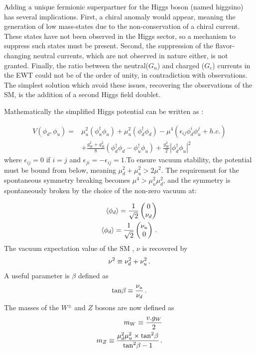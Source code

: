 Adding a unique fermionic superpartner for the Higgs boson (named higgsino) has several implications. First, a chiral anomaly would appear, meaning the generation of low mass-states due to the non-conservation of a chiral current. These states have not been observed in the Higgs sector, so a mechanism to suppress such states must be present. Second, the suppression of the flavor-changing neutral currents, which are not observed in nature either, is not granted. Finally, the ratio between the neutral($G_n$) and charged ($G_c$) currents in the EWT could not be of the order of unity, in contradiction with observations. The simplest solution which avoid these issues, recovering the observations of the SM, is the addition of a second Higgs field doublet.

Mathematically the simplified Higgs potential can be written as \cite{Nagashima:2014tva}:

\begin{align}
    V(\phi_d , \phi_u) = & \mu^{2}_u (\phi^{\dagger}_u \phi_u) + \mu^{2}_u (\phi^{\dagger}_d \phi_d) - \mu^{4}(\epsilon_{ij}\phi^{i}_d \phi^{j}_u + h.c.) \\ & + \frac{g^{2}_W + g^{2}_B}{8}(\phi^{\dagger}_d \phi_d - \phi^{\dagger}_u \phi_u) + \frac{g^{2}_W}{2} | \phi^{\dagger}_d \phi_u |^2
\end{align}
where $\epsilon_{ij} = 0$ if $i = j$ and $\epsilon_{ji} = -\epsilon_{ij} = 1$.To ensure vacuum stability, the potential must be bound from below, meaning $\mu_{d}^2 + \mu_{u}^2 > 2\mu^2$. The requirement for the spontaneous symmetry breaking becomes $\mu^4 > \mu_{u}^2 \mu_{d}^2$, and the symmetry is spontaneously broken by the choice of the non-zero vacuum at:

\begin{align}
    \langle \phi_d \rangle = \frac{1}{\sqrt{2}} \begin{pmatrix} 0 \\ \nu_d \end{pmatrix} \\
    \langle \phi_d \rangle = \frac{1}{\sqrt{2}} \begin{pmatrix} \nu_u \\ 0 \end{pmatrix} \mend
\end{align}
The vacuum expectation value of the SM , $\nu$ is recovered by
\begin{equation}
    \nu^2 \equiv \nu_{d}^2 + \nu_{u}^2 \mend
\end{equation}
A useful parameter is $\beta$ defined as 
\begin{equation}
    \mathrm{tan} \beta \equiv \frac{\nu_u}{\nu_d} \mend
\end{equation}
The masses of the $W^{\pm}$ and $Z$ bosons are now defined as 
\begin{align}
    m_W \equiv \frac{v.g_W}{2} \\
    m_Z \equiv \frac{\mu_{d}^2 \mu_{u}^2 \times \mathrm{tan}^2 \beta}{\mathrm{tan}^2 \beta - 1} \mend
\end{align}

